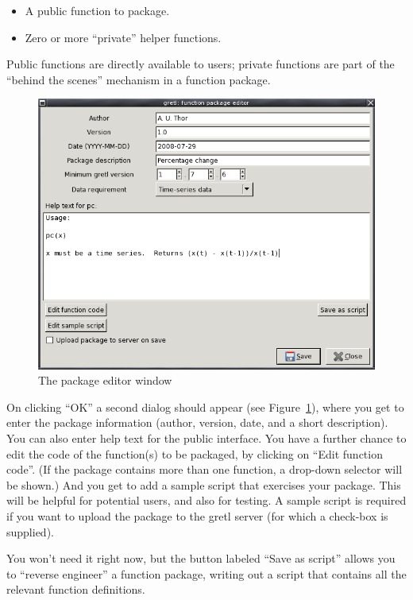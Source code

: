\begin{itemize}
\item A public function to package.
\item Zero or more ``private'' helper functions.
\end{itemize}

Public functions are directly available to users; private functions are
part of the ``behind the scenes'' mechanism in a function package.

\begin{figure}[htbp]
  \centering
  \includegraphics[scale=0.5]{figures/package_editor}
  \caption{The package editor window}
  \label{fig:package_editor}
\end{figure}

On clicking ``OK'' a second dialog should appear (see
Figure~\ref{fig:package_editor}), where you get to enter the package
information (author, version, date, and a short description).  You can
also enter help text for the public interface.  You have a further
chance to edit the code of the function(s) to be packaged, by clicking
on ``Edit function code''.  (If the package contains more than one
function, a drop-down selector will be shown.)  And you get to add a
sample script that exercises your package.  This will be helpful for
potential users, and also for testing.  A sample script is required if
you want to upload the package to the gretl server (for which a
check-box is supplied).

You won't need it right now, but the button labeled ``Save as script''
allows you to ``reverse engineer'' a function package, writing out a
script that contains all the relevant function definitions.

